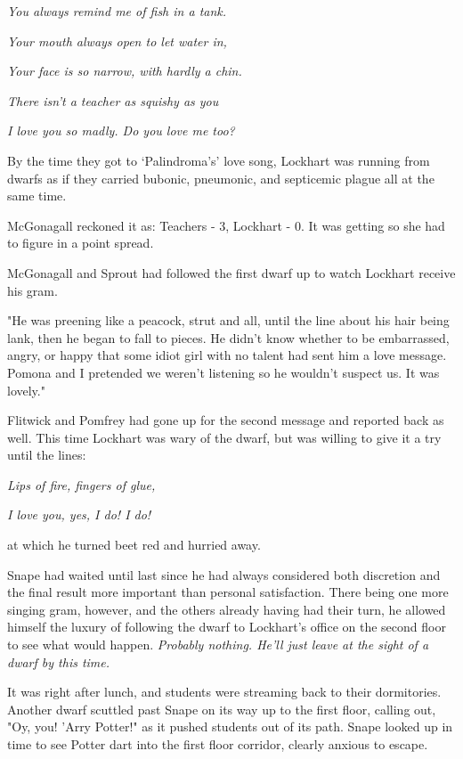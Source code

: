 \emph{You always remind me of fish in a tank.}

\emph{Your mouth always open to let water in,}

\emph{Your face is so narrow, with hardly a chin.}

\emph{There isn't a teacher as squishy as you}

\emph{I love you so madly. Do you love me too?}

By the time they got to `Palindroma's' love song, Lockhart was running from dwarfs as if they carried bubonic, pneumonic, and septicemic plague all at the same time.

McGonagall reckoned it as: Teachers - 3, Lockhart - 0. It was getting so she had to figure in a point spread.

McGonagall and Sprout had followed the first dwarf up to watch Lockhart receive his gram.

"He was preening like a peacock, strut and all, until the line about his hair being lank, then he began to fall to pieces. He didn't know whether to be embarrassed, angry, or happy that some idiot girl with no talent had sent him a love message. Pomona and I pretended we weren't listening so he wouldn't suspect us. It was lovely."

Flitwick and Pomfrey had gone up for the second message and reported back as well. This time Lockhart was wary of the dwarf, but was willing to give it a try until the lines:

\emph{Lips of fire, fingers of glue,}

\emph{I love you, yes, I do! I do!}

at which he turned beet red and hurried away.

Snape had waited until last since he had always considered both discretion and the final result more important than personal satisfaction. There being one more singing gram, however, and the others already having had their turn, he allowed himself the luxury of following the dwarf to Lockhart's office on the second floor to see what would happen. \emph{Probably nothing. He'll just leave at the sight of a dwarf by this time.}

It was right after lunch, and students were streaming back to their dormitories. Another dwarf scuttled past Snape on its way up to the first floor, calling out, "Oy, you! 'Arry Potter!" as it pushed students out of its path. Snape looked up in time to see Potter dart into the first floor corridor, clearly anxious to escape.

